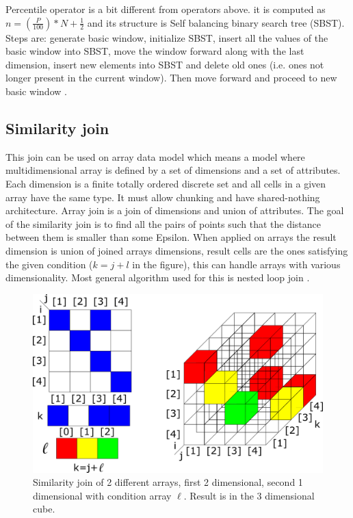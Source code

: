 Percentile operator is a bit different from operators above. it is computed as $n=(\frac{P}{100})*N+\frac{1}{2}$ and its structure is Self balancing binary search tree (SBST). Steps are: generate basic window, initialize SBST, insert all the values of the basic window into SBST, move the window forward along with the last dimension, insert new elements into SBST and delete old ones (i.e. ones not longer present in the current window). Then move forward and proceed to new basic window \cite{windowAggr}.

\subsection{Similarity join}
This join can be used on array data model which means a model where multidimensional array is defined by a set of dimensions and a set of attributes. Each dimension is a finite totally ordered discrete set and all cells in a given array have the same type. It must allow chunking and have shared-nothing architecture. Array join is a join of dimensions and union of attributes. The goal of the similarity join is to find all the pairs of points such that the distance between them is smaller than some Epsilon.
When applied on arrays the result dimension is union of joined arrays dimensions, result cells are the ones satisfying the given condition ($k=j+l$ in the figure), this can handle arrays with various dimensionality. Most general algorithm used for this is nested loop join \cite{simJoin}.

\begin{figure}
\centering
\includegraphics[scale=0.38]{simjoin.png}
\caption{Similarity join of 2 different arrays, first 2 dimensional, second 1 dimensional with condition array $\ell$. Result is in the 3 dimensional cube.}
\end{figure}


